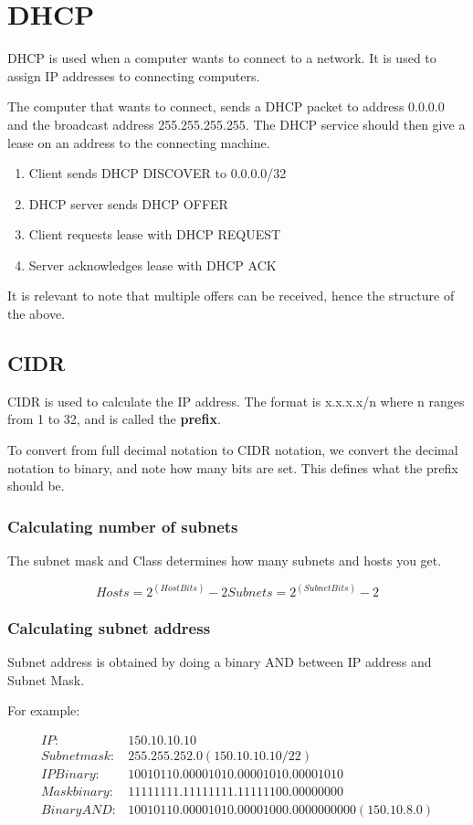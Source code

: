 \section{DHCP}
DHCP is used when a computer wants to connect to a network. It is used
to assign IP addresses to connecting computers.

The computer that wants to connect, sends a DHCP packet to address
0.0.0.0 and the broadcast address 255.255.255.255. The DHCP service
should then give a lease on an address to the connecting
machine.

\begin{enumerate}
    \item Client sends DHCP DISCOVER to 0.0.0.0/32
    \item DHCP server sends DHCP OFFER
    \item Client requests lease with DHCP REQUEST
    \item Server acknowledges lease with DHCP ACK
\end{enumerate}

It is relevant to note that multiple offers can be received, hence the structure
of the above.

\subsection{CIDR}
CIDR is used to calculate the IP address. The format is x.x.x.x/n
where n ranges from 1 to 32, and is called the \textbf{prefix}.

To convert from full decimal notation to CIDR notation, we convert the
decimal notation to binary, and note how many bits are set. This
defines what the prefix should be.

\subsubsection{Calculating number of subnets}
The subnet mask and Class determines how many subnets and hosts you get.

\[Hosts = 2^(HostBits)-2
    Subnets = 2^(SubnetBits)-2
\]

\subsubsection{Calculating subnet address}
Subnet address is obtained by doing a binary AND between IP address and Subnet Mask.

For example:

\begin{align*}
    IP:          &150.10.10.10\\
    Subnet mask: &255.255.252.0 (150.10.10.10/22)\\
    IP Binary:   &10010110.00001010.00001010.00001010\\
    Mask binary: &11111111.11111111.11111100.00000000\\
    Binary AND:  &10010110.00001010.00001000.0000000000 (150.10.8.0)
\end{align*}


